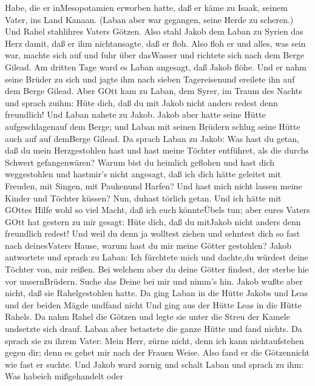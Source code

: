 Habe, die er inMesopotamien erworben hatte, daß er käme zu Isaak, seinem
Vater, ins Land Kanaan.  (Laban aber war gegangen, seine
Herde zu scheren.) Und Rahel stahlihres Vaters Götzen. 
Also stahl Jakob dem Laban zu Syrien das Herz damit, daß er ihm
nichtansagte, daß er floh.  Also floh er und alles, was
sein war, machte sich auf und fuhr über dasWasser und richtete sich nach
dem Berge Gilead.  Am dritten Tage ward es Laban angesagt,
daß Jakob flöhe.  Und er nahm seine Brüder zu sich und
jagte ihm nach sieben Tagereisenund ereilete ihn auf dem Berge Gilead.
 Aber GOtt kam zu Laban, dem Syrer, im Traum des Nachts und
sprach zuihm: Hüte dich, daß du mit Jakob nicht anders redest denn
freundlich!  Und Laban nahete zu Jakob. Jakob aber hatte
seine Hütte aufgeschlagenauf dem Berge; und Laban mit seinen Brüdern
schlug seine Hütte auch auf auf demBerge Gilead.  Da sprach
Laban zu Jakob: Was hast du getan, daß du mein Herzgestohlen hast und
hast meine Töchter entführet, als die durchs Schwert gefangenwären?
 Warum bist du heimlich geflohen und hast dich weggestohlen
und hastmir's nicht angesagt, daß ich dich hätte geleitet mit Freuden,
mit Singen, mit Paukenund Harfen?  Und hast mich nicht
lassen meine Kinder und Töchter küssen? Nun, duhast törlich getan.
 Und ich hätte mit GOttes Hilfe wohl so viel Macht, daß ich
euch könnteÜbels tun; aber eures Vaters GOtt hat gestern zu mir gesagt:
Hüte dich, daß du mitJakob nicht anders denn freundlich redest!
 Und weil du denn ja wolltest ziehen und sehntest dich so
fast nach deinesVaters Hause, warum hast du mir meine Götter gestohlen?
 Jakob antwortete und sprach zu Laban: Ich fürchtete mich
und dachte,du würdest deine Töchter von, mir reißen.  Bei
welchem aber du deine Götter findest, der sterbe hie vor unsernBrüdern.
Suche das Deine bei mir und nimm's hin. Jakob wußte aber nicht, daß sie
Rahelgestohlen hatte.  Da ging Laban in die Hütte Jakobs
und Leas und der beiden Mägde undfand nicht Und ging aus der Hütte Leas
in die Hütte Rahels.  Da nahm Rahel die Götzen und legte
sie unter die Streu der Kamele undsetzte sich drauf. Laban aber
betastete die ganze Hütte und fand nichts.  Da sprach sie
zu ihrem Vater: Mein Herr, zürne nicht, denn ich kann nichtaufstehen
gegen dir; denn es gehet mir nach der Frauen Weise. Also fand er die
Götzennicht wie fast er suchte.  Und Jakob ward zornig und
schalt Laban und sprach zu ihm: Was habeich mißgehandelt oder
